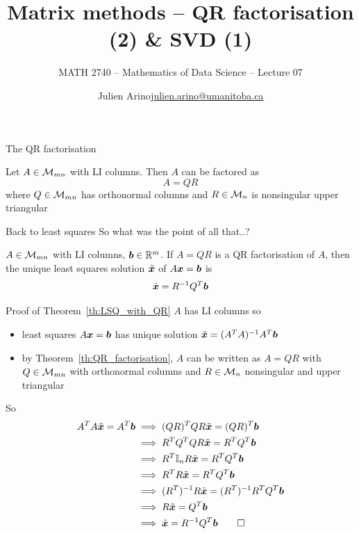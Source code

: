 \documentclass[aspectratio=169]{beamer}\usepackage[]{graphicx}\usepackage[]{xcolor}
\subtitle{MATH 2740 -- Mathematics of Data Science -- Lecture 07}
\author{\texorpdfstring{Julien Arino\newline\url{julien.arino@umanitoba.ca}}{Julien Arino}}
\institute{Department of Mathematics @ University of Manitoba}
\title{Matrix methods -- QR factorisation (2) \& SVD (1)}
\begin{document}
\setcounter{theorem}{69}




\begin{frame}{The QR factorisation}
\begin{importanttheorem}\label{th:QR_factorisation}
Let $A\in\mathcal{M}_{mn}$ with LI columns. Then $A$ can be factored as
\[
A=QR
\]
where $Q\in\mathcal{M}_{mn}$ has orthonormal columns and $R\in\mathcal{M}_n$ is nonsingular upper triangular
\end{importanttheorem}
\end{frame}


\begin{frame}{Back to least squares}
So what was the point of all that..?
\vfill
\begin{importanttheorem}
\label{th:LSQ_with_QR}
$A\in\mathcal{M}_{mn}$ with LI columns, $\bm{b}\in\mathbb{R}^m$. If $A=QR$ is a QR factorisation of $A$, then the unique least squares solution $\tilde{\bm{x}}$ of $A\bm{x}=\bm{b}$ is
\[
\tilde{\bm{x}} = R^{-1}Q^T\bm{b}
\]
\end{importanttheorem}
\end{frame}


\begin{frame}{Proof of Theorem~\ref{th:LSQ_with_QR}}
$A$ has LI columns so 
\begin{itemize}
\item least squares $A\bm{x}=\bm{b}$ has unique solution $\tilde{\bm{x}}=(A^TA)^{-1}A^T\bm{b}$
\item by Theorem~\ref{th:QR_factorisation}, $A$ can be written as $A=QR$ with $Q\in\mathcal{M}_{mn}$ with orthonormal columns and $R\in\mathcal{M}_n$ nonsingular and upper triangular
\end{itemize}
So
\begin{align*}
A^TA\tilde\bx= A^T\bb &\implies (QR)^TQR\tilde\bx = (QR)^T\bb \\
&\implies R^TQ^TQR\tilde\bx = R^TQ^T\bb \\
&\implies R^T\II_nR\tilde\bx = R^TQ^T\bb \\
&\implies R^TR\tilde\bx = R^TQ^T\bb \\
&\implies (R^T)^{-1}R\tilde\bx = (R^T)^{-1}R^TQ^T\bb \\
&\implies R\tilde\bx = Q^T\bb \\
&\implies \tilde\bx = R^{-1}Q^T\bb\hfill\qed
\end{align*}
\end{frame}
\end{document}
